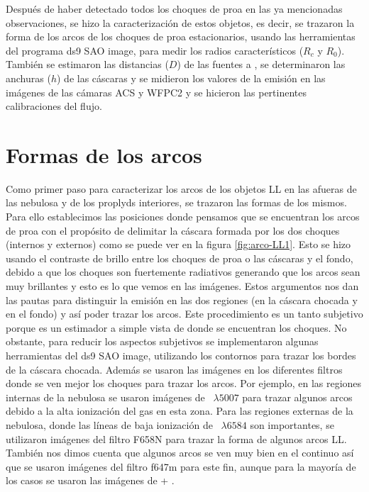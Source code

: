 Después de haber detectado todos los choques de proa en las ya mencionadas observaciones, se hizo la caracterización de estos objetos, es decir, se trazaron la forma de los arcos de los choques de proa estacionarios, usando las herramientas del programa ds9 SAO image, para medir los radios característicos (\(R_{c}\) y \( R_{0}\)). También se estimaron las distancias (\(D\)) de las fuentes a \thC{}, se determinaron las anchuras (\(h\)) de las cáscaras y se  midieron  los valores de la emisión en las imágenes de las cámaras ACS y WFPC2 y se hicieron las pertinentes calibraciones del flujo.

\section{Formas de los arcos}
\label{sec:arcos}

Como primer paso para caracterizar los arcos de los objetos LL en las afueras de las nebulosa y de los proplyds interiores, se trazaron las formas de los mismos. Para ello establecimos las posiciones donde pensamos que se encuentran los arcos de proa con el propósito de delimitar la cáscara formada por los dos choques (internos y externos) como se puede ver en la figura \ref{fig:arco-LL1}. Esto se hizo usando el contraste de brillo entre los choques de proa o las cáscaras y el fondo, debido a que los choques son fuertemente radiativos generando que los arcos sean muy brillantes y esto es lo que vemos en las imágenes. Estos argumentos nos dan las pautas para distinguir la emisión en las dos regiones (en la cáscara chocada y en el fondo) y así poder trazar los arcos. Este procedimiento es un tanto subjetivo porque es un estimador a simple vista de donde se encuentran los choques. No obstante, para reducir los aspectos subjetivos se implementaron algunas herramientas del ds9 SAO image, utilizando los contornos para trazar los bordes de la cáscara chocada. Además se usaron las imágenes en los diferentes filtros donde se ven mejor los choques para trazar los arcos. Por ejemplo, en las regiones internas de la nebulosa se usaron imágenes de \oiii{}~\(\lambda5007\) para trazar algunos arcos debido a la alta ionización del gas en esta zona. Para las regiones externas de la nebulosa, donde las líneas de baja ionización de \nii{}~\(\lambda6584\) son importantes, se utilizaron imágenes del filtro F658N para trazar la forma de algunos arcos LL. También nos dimos cuenta que algunos arcos se ven muy bien en el continuo así que se usaron imágenes del filtro f647m para este fin, aunque para la mayoría de los casos se usaron las imágenes de \ha{} + \nii{}.\\

